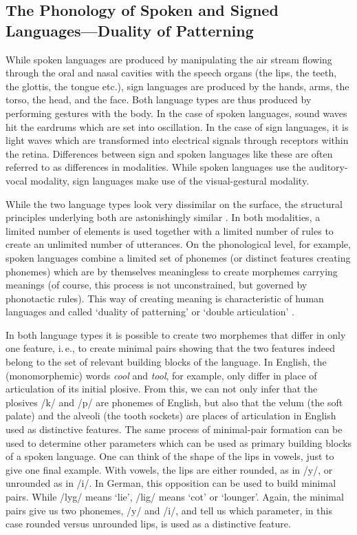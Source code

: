 \subsection{The Phonology of Spoken and Signed Languages---Duality of Patterning}
While spoken languages are produced by manipulating the air stream flowing through the oral and nasal cavities with the speech organs (the lips, the teeth, the glottis, the tongue etc.), sign languages are produced by the hands, arms, the torso, the head, and the face. Both language types are thus produced by performing gestures with the body. In the case of spoken languages, sound waves hit the eardrums which are set into oscillation. In the case of sign languages, it is light waves which are transformed into electrical signals through receptors within the retina. Differences between sign and spoken languages like these are often referred to as differences in modalities. While spoken languages use the auditory-vocal modality, sign languages make use of the visual-gestural modality. 

While the two language types look very dissimilar on the surface, the structural principles underlying both are astonishingly similar \citep{sandler1989phonology,brentari1998prosodic}. In both modalities, a limited number of elements is used together with a limited number of rules to create an unlimited number of utterances. On the phonological level, for example, spoken languages combine a limited set of phonemes (or distinct features creating phonemes) which are by themselves meaningless to create morphemes carrying meanings (of course, this process is not unconstrained, but governed by phonotactic rules). This way of creating meaning is characteristic of human languages and called `duality of patterning' or `double articulation' \citep{martinet1949double, hockett1960origin}.

In both language types it is possible to create two morphemes that differ in only one feature, i.\,e., to create minimal pairs showing that the two features indeed belong to the set of relevant building blocks of the language. In English, the (monomorphemic) words \textit{cool} and \textit{tool}, for example, only differ in place of articulation of its initial plosive. From this, we can not only infer that the plosives /k/ and /p/ are phonemes of English, but also that the velum (the soft palate) and the alveoli (the tooth sockets) are places of articulation in English used as distinctive features. The same process of minimal-pair formation can be used to determine other parameters which can be used as primary building blocks of a spoken language. One can think of the shape of the lips in vowels, just to give one final example. With vowels, the lips are either rounded, as in /y/, or unrounded as in /i/. In German, this opposition can be used to build minimal pairs. While /ly\textlengthmark g\textschwa / means `lie', /li\textlengthmark g\textschwa / means `cot' or `lounger'. Again, the minimal pairs give us two phonemes, /y\textlengthmark/ and /i\textlengthmark /, and tell us which parameter, in this case rounded versus unrounded lips, is used as a distinctive feature. 

